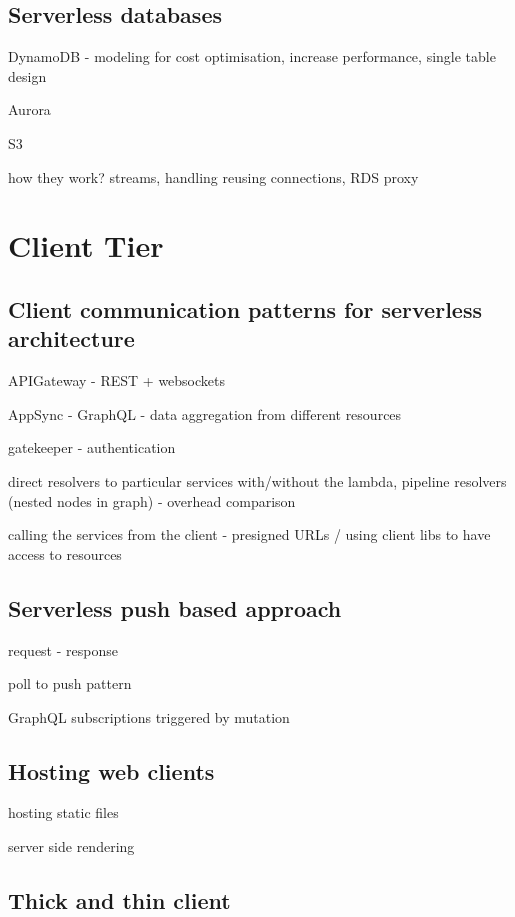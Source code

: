 \subsection{Serverless databases}


DynamoDB - modeling for cost optimisation, increase performance, single table design

Aurora

S3

how they work? streams, handling reusing connections, RDS proxy

\section{Client Tier}

\subsection{Client communication patterns for serverless architecture}


APIGateway - REST + websockets

AppSync - GraphQL - data aggregation from different resources

gatekeeper - authentication

direct resolvers to particular services with/without the lambda, pipeline resolvers (nested nodes in graph) - overhead comparison

calling the services from the client - presigned URLs / using client libs to have access to resources

\subsection{Serverless push based approach}


request - response

poll to push pattern

GraphQL subscriptions triggered by mutation

\subsection{Hosting web clients}

hosting static files

server side rendering

\subsection{Thick and thin client}

